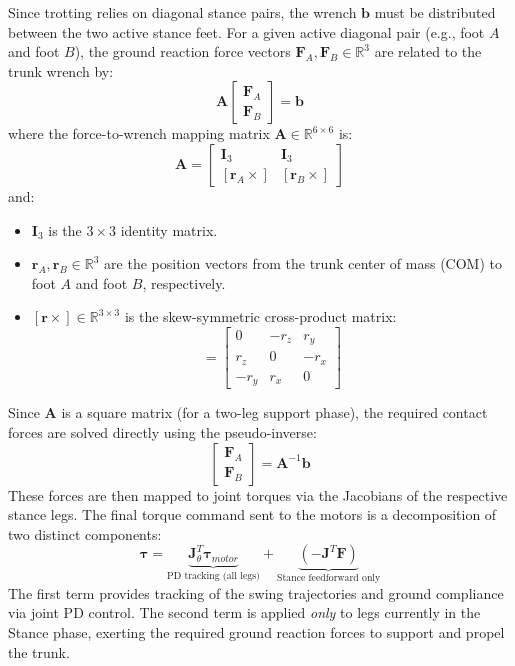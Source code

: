 \documentclass[11pt,a4paper]{article}
\begin{document}
Since trotting relies on diagonal stance pairs, the wrench $\mathbf{b}$ must be distributed between the two active stance feet. For a given active diagonal pair (e.g., foot $A$ and foot $B$), the ground reaction force vectors $\mathbf{F}_A, \mathbf{F}_B \in \mathbb{R}^3$ are related to the trunk wrench by:
\begin{equation}
\mathbf{A} \begin{bmatrix} \mathbf{F}_A \\ \mathbf{F}_B \end{bmatrix} = \mathbf{b}
\end{equation}
where the force-to-wrench mapping matrix $\mathbf{A} \in \mathbb{R}^{6 \times 6}$ is:
\begin{equation}
\mathbf{A} = \begin{bmatrix}
\mathbf{I}_3 & \mathbf{I}_3 \\
[\mathbf{r}_A \times] & [\mathbf{r}_B \times]
\end{bmatrix}
\end{equation}
and:
\begin{itemize}
    \item $\mathbf{I}_3$ is the $3 \times 3$ identity matrix.
    \item $\mathbf{r}_A, \mathbf{r}_B \in \mathbb{R}^3$ are the position vectors from the trunk center of mass (COM) to foot $A$ and foot $B$, respectively.
    \item $[\mathbf{r} \times] \in \mathbb{R}^{3 \times 3}$ is the skew-symmetric cross-product matrix:
    \begin{equation}
    [\mathbf{r} \times] = \begin{bmatrix}
    0 & -r_z & r_y \\
    r_z & 0 & -r_x \\
    -r_y & r_x & 0
    \end{bmatrix}
    \end{equation}
\end{itemize}

Since $\mathbf{A}$ is a square matrix (for a two-leg support phase), the required contact forces are solved directly using the pseudo-inverse:
\begin{equation}
\begin{bmatrix} \mathbf{F}_A \\ \mathbf{F}_B \end{bmatrix} = \mathbf{A}^{-1} \mathbf{b}
\end{equation}
These forces are then mapped to joint torques via the Jacobians of the respective stance legs. The final torque command sent to the motors is a decomposition of two distinct components:
\begin{equation}
\boldsymbol{\tau} = \underbrace{\mathbf{J}_\theta^T \boldsymbol{\tau}_{motor}}_{\text{PD tracking (all legs)}} + \underbrace{(-\mathbf{J}^T \mathbf{F})}_{\text{Stance feedforward only}}
\end{equation}
The first term provides tracking of the swing trajectories and ground compliance via joint PD control. The second term is applied \textit{only} to legs currently in the Stance phase, exerting the required ground reaction forces to support and propel the trunk.
\end{document}
